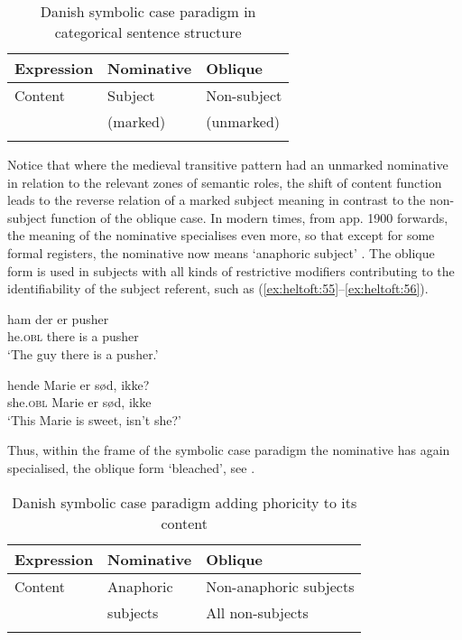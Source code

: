 \documentclass[output=paper]{langscibook}
\begin{document}
\begin{table}
\caption{Danish symbolic case paradigm in categorical sentence structure\label{tab:heltoft:11}}
\begin{tabular}{lll}
\lsptoprule
{Expression} & {Nominative} & {Oblique} \\
\midrule
{Content}  & {Subject}  & {Non-subject} \\
& {(marked)} & {(unmarked)}\\
\lspbottomrule
\end{tabular}
\end{table}

Notice that where the medieval transitive pattern had an unmarked nominative in relation to the relevant zones of semantic roles, the shift of content function leads to the reverse relation of a marked subject meaning in contrast to the non-subject function of the oblique case. In modern times, from app. 1900 forwards, the meaning of the nominative specialises even more, so that except for some formal registers, the nominative now means ‘anaphoric subject' \citep{Hansen1967}. The oblique form is used in subjects with all kinds of restrictive modifiers contributing to the identifiability of the subject referent, such as (\ref{ex:heltoft:55}--\ref{ex:heltoft:56}). 

\begin{exe}
\ex \label{ex:heltoft:55}
    \gll ham der       er pusher\\
         he.\textsc{obl} there  is {a pusher}\\
    \glt ‘The guy there is a pusher.'

\ex \label{ex:heltoft:56}
    \gll hende     Marie  er sød, ikke?\\
         she.\textsc{obl}  Marie  er sød, ikke\\
    \glt ‘This Marie is sweet, isn't she?'
\end{exe}

Thus, within the frame of the symbolic case paradigm the nominative has again specialised, the oblique form ‘bleached', see . 


\begin{table}
\caption{Danish symbolic case paradigm adding phoricity to its content\label{tab:heltoft:12}}
\begin{tabular}{lll}
\lsptoprule
{Expression} & {Nominative}  & {Oblique}\\
\midrule
{Content} & {Anaphoric} & {Non-anaphoric subjects} \\
& {subjects} &  {All non-subjects}\\
\lspbottomrule
\end{tabular}
\end{table}
\end{document}
